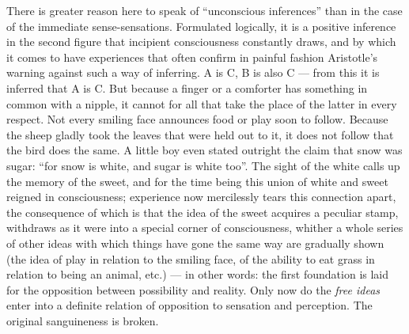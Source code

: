 \documentclass[12pt,a4paper]{book}
\newcommand{\opage}[1]{\marginnote{\footnotesize\textit{[#1]}}}
\begin{document}
There is greater reason here to speak of ``unconscious inferences'' than
in the case of the immediate sense-sensations. Formulated logically, it is
a positive inference in the second figure that incipient consciousness
constantly draws, and by which it comes to have experiences that often
confirm in painful fashion Aristotle's warning against such a way of
inferring. A is C, B is also C --- from this it is inferred that A is C.
But because a finger or a comforter has something in common with a nipple,
it cannot for all that take the place of the latter in every respect.
Not every smiling face announces food or play soon to follow. Because the
sheep gladly took the leaves that were held out
\opage{162}to it, it does not follow that the bird does the same. A little
boy even stated outright the claim that snow was sugar: ``for snow is
white, and sugar is white too''. The sight of the white calls up the
memory of the sweet, and for the time being this union of white and sweet
reigned in consciousness; experience now mercilessly tears this
connection apart, the consequence of which is that the idea of the sweet
acquires a peculiar stamp, withdraws as it were into a special corner of
consciousness, whither a whole series of other ideas with which things
have gone the same way are gradually shown (the idea of play in relation
to the smiling face, of the ability to eat grass in relation to being an
animal, etc.) --- in other words: the first foundation is laid for the
opposition between possibility and reality. Only now do the \emph{free
ideas} enter into a definite relation of opposition to sensation and
perception. The original sanguineness is broken.
\end{document}
